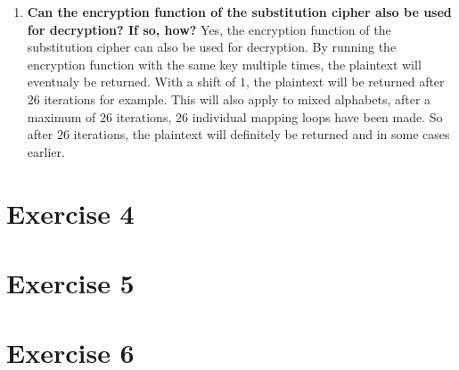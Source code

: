 \documentclass{report}
\begin{document}
\begin{enumerate}
      \item \textbf{Can the encryption function of the substitution cipher also be used for decryption? If so, how?}
            Yes, the encryption function of the substitution cipher can also be used for decryption.
            By running the encryption function with the same key multiple times, the plaintext will eventualy be returned.
            With a shift of $1$, the plaintext will be returned after $26$ iterations for example.
            This will also apply to mixed alphabets, after a maximum of $26$ iterations, $26$ individual mapping loops have been made.
            So after $26$ iterations, the plaintext will definitely be returned and in some cases earlier.

\end{enumerate}

\section*{Exercise 4}

\section*{Exercise 5}

\section*{Exercise 6}
\end{document}
